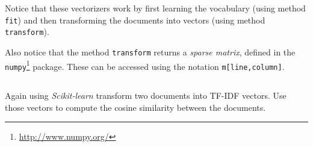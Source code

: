 \documentclass[12pt]{article}
\begin{document}
Notice that these vectorizers work by first learning the vocabulary (using method \verb+fit+) and then transforming the documents into vectors (using method \verb+transform+).

Also notice that the method \verb+transform+ returns a \emph{sparse matrix}, defined in the \texttt{numpy}\footnote{\url{http://www.numpy.org/}} package. These can be accessed using the notation \verb+m[line,column]+.

\subsection{}

Again using \emph{Scikit-learn} transform two documents into TF-IDF vectors. Use those vectors to compute the cosine similarity between the documents.
\end{document}
